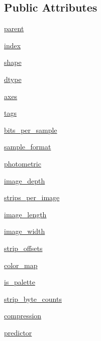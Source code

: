 \subsection*{Public Attributes}
\begin{DoxyCompactItemize}
\item 
\hyperlink{classtifffile_1_1_tiff_page_ab448d691bfba9af88ba2658afc1b8607}{parent}
\item 
\hyperlink{classtifffile_1_1_tiff_page_abcdadcc105890e623a2ce56877d74c6d}{index}
\item 
\hyperlink{classtifffile_1_1_tiff_page_af842924ca07e0f250d2ffdcbbf1afee1}{shape}
\item 
\hyperlink{classtifffile_1_1_tiff_page_ad49c26fc7bb2cfa901aa5664879bee65}{dtype}
\item 
\hyperlink{classtifffile_1_1_tiff_page_ac28c18fcf1ee6655eaaaf035a34c9d67}{axes}
\item 
\hyperlink{classtifffile_1_1_tiff_page_aa35f477474445140346421065a4c016b}{tags}
\item 
\hyperlink{classtifffile_1_1_tiff_page_a04d82b99a53cb0b445162c2e5138d136}{bits\-\_\-per\-\_\-sample}
\item 
\hyperlink{classtifffile_1_1_tiff_page_aef04ecb2f6f230925aeb43ac3b89e30d}{sample\-\_\-format}
\item 
\hyperlink{classtifffile_1_1_tiff_page_af115186598b38bc4390942115755f7b6}{photometric}
\item 
\hyperlink{classtifffile_1_1_tiff_page_ac119ed52ce81ef4997ada9444c39562e}{image\-\_\-depth}
\item 
\hyperlink{classtifffile_1_1_tiff_page_a2c728cfc9795dc4bf187308d551cecb1}{strips\-\_\-per\-\_\-image}
\item 
\hyperlink{classtifffile_1_1_tiff_page_aa98d8b1ccceb95ebd19896249f9f4796}{image\-\_\-length}
\item 
\hyperlink{classtifffile_1_1_tiff_page_aa16948ea525cd29705c896e1451290fa}{image\-\_\-width}
\item 
\hyperlink{classtifffile_1_1_tiff_page_aa3c254120ad8e9394ecb5c743ebf7434}{strip\-\_\-offsets}
\item 
\hyperlink{classtifffile_1_1_tiff_page_a58f5c25b8b86eb6c9a5b393e9d43c2f4}{color\-\_\-map}
\item 
\hyperlink{classtifffile_1_1_tiff_page_a376e981b0117a1be89cf336c317fd6cd}{is\-\_\-palette}
\item 
\hyperlink{classtifffile_1_1_tiff_page_ac55af94dba8786edaf1e89d205aed908}{strip\-\_\-byte\-\_\-counts}
\item 
\hyperlink{classtifffile_1_1_tiff_page_af35a60f003687668b066628dc8a1c1b5}{compression}
\item 
\hyperlink{classtifffile_1_1_tiff_page_ad51af99f663803ce6f02e124bb2db690}{predictor}
\end{DoxyCompactItemize}


